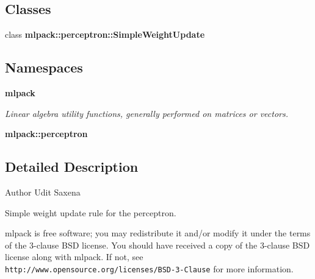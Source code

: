 \subsection*{Classes}
\begin{DoxyCompactItemize}
\item 
class {\bf mlpack\+::perceptron\+::\+Simple\+Weight\+Update}
\end{DoxyCompactItemize}
\subsection*{Namespaces}
\begin{DoxyCompactItemize}
\item 
 {\bf mlpack}
\begin{DoxyCompactList}\small\item\em Linear algebra utility functions, generally performed on matrices or vectors. \end{DoxyCompactList}\item 
 {\bf mlpack\+::perceptron}
\end{DoxyCompactItemize}


\subsection{Detailed Description}
\begin{DoxyAuthor}{Author}
Udit Saxena
\end{DoxyAuthor}
Simple weight update rule for the perceptron.

mlpack is free software; you may redistribute it and/or modify it under the terms of the 3-\/clause B\+SD license. You should have received a copy of the 3-\/clause B\+SD license along with mlpack. If not, see {\tt http\+://www.\+opensource.\+org/licenses/\+B\+S\+D-\/3-\/\+Clause} for more information. 